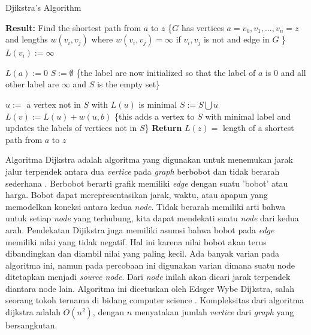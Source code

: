 \documentclass[conference]{IEEEtran}
\begin{document}

\begin{algorithm}[H]
    \caption{Djikstra's Algorithm}\label{alg:Djikstra}
\begin{algorithmic}
    \State \textbf{Result:} Find the shortest path from $a$ to $z$
        \State \{$G$ has vertices $a = v_0,v_1,...,v_n = z$ and lengths $w(v_i,v_j)$ where $w(v_i,v_j)=\infty$ if $v_i,v_j$ is not and edge in $G$ \}
            \State $L(v_i) := \infty$
        \EndFor

        \State $L(a) := 0$
        \State $S := \emptyset$
        \State \{the label are now initialized so that the label of $a$ is 0 and all other label are $\infty$ and $S$ is the empty set\}

            \State $u :=$ a vertex not in $S$ with $L(u)$ is minimal
            \State $S:= S \bigcup {u}$
                    \State $L(v) := L(u) + w(u,b)$
                    \State \{this adds a vertex to $S$ with minimal label and updates the labels of vertices not in $S$\}
                \EndIf
            \EndFor
        \EndWhile
    \EndProcedure
    \State \textbf{Return} $L(z) =$ length of a shortest path from $a$ to $z$
\end{algorithmic}
\end{algorithm}

    Algoritma Dijkstra adalah algoritma yang digunakan untuk
    menemukan jarak jalur terpendek antara dua \textit{vertice} pada
    \textit{graph} berbobot dan tidak berarah sederhana \cite{koshy2004discrete}. Berbobot
    berarti grafik memiliki \textit{edge} dengan suatu 'bobot' atau harga.
    Bobot dapat merepresentasikan jarak, waktu, atau apapun
    yang memodelkan koneksi antara kedua \textit{node}. Tidak berarah
    memiliki arti bahwa untuk setiap \textit{node} yang terhubung, kita
    dapat mendekati suatu \textit{node} dari kedua arah. Pendekatan Dijikstra juga memiliki asumsi bahwa bobot pada \textit{edge} memiliki
    nilai yang tidak negatif. Hal ini karena nilai bobot akan
    terus dibandingkan dan diambil nilai yang paling kecil. Ada
    banyak varian pada algoritma ini, namun pada percobaan
    ini digunakan varian dimana suatu node ditetapkan menjadi
    \textit{source node}. Dari \textit{node} inilah akan dicari jarak terpendek
    diantara node lain. Algoritma ini dicetuskan oleh Edsger
    Wybe Dijkstra, salah seorang tokoh ternama di bidang computer science \cite{dijkstra1959note}. Kompleksitas dari algoritma dijkstra adalah $O(n^2)$,
    dengan $n$ menyatakan jumlah \textit{vertice} dari \textit{graph} yang
    bersangkutan.
\end{document}
